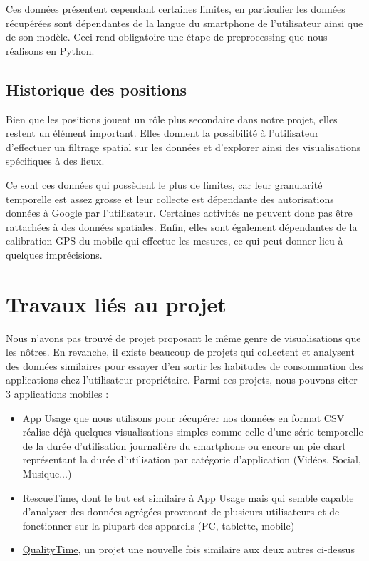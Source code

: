\documentclass[a4paper, 11pt]{article}
\begin{document}
        Ces données présentent cependant certaines limites, en particulier les données récupérées sont dépendantes de la langue du smartphone de l'utilisateur ainsi que de son modèle. Ceci rend obligatoire une étape de preprocessing que nous réalisons en Python.

        \subsection{Historique des positions}
        Bien que les positions jouent un rôle plus secondaire dans notre projet, elles restent un élément important. Elles donnent la possibilité à l'utilisateur d'effectuer un filtrage spatial sur les données et d'explorer ainsi des visualisations spécifiques à des lieux.

        Ce sont ces données qui possèdent le plus de limites, car leur granularité temporelle est assez grosse et leur collecte est dépendante des autorisations données à Google par l'utilisateur. Certaines activités ne peuvent donc pas être rattachées à des données spatiales. Enfin, elles sont également dépendantes de la calibration GPS du mobile qui effectue les mesures, ce qui peut donner lieu à quelques imprécisions.

    \section{Travaux liés au projet}
    Nous n'avons pas trouvé de projet proposant le même genre de visualisations que les nôtres. En revanche, il existe beaucoup de projets qui collectent et analysent des données similaires pour essayer d'en sortir les habitudes de consommation des applications chez l'utilisateur propriétaire. Parmi ces projets, nous pouvons citer 3 applications mobiles :
    \begin{itemize}
        \item \href{https://play.google.com/store/apps/details?id=com.a0soft.gphone.uninstaller&hl=fr}{App Usage} que nous utilisons pour récupérer nos données en format CSV réalise déjà quelques visualisations simples comme celle d'une série temporelle de la durée d'utilisation journalière du smartphone ou encore un pie chart représentant la durée d'utilisation par catégorie d'application (Vidéos, Social, Musique...)
        \item \href{https://www.rescuetime.com/}{RescueTime}, dont le but est similaire à App Usage mais qui semble capable d'analyser des données agrégées provenant de plusieurs utilisateurs et de fonctionner sur la plupart des appareils (PC, tablette, mobile)
        \item \href{https://play.google.com/store/apps/details?id=com.zerodesktop.appdetox.qualitytime&hl=fr}{QualityTime}, un projet une nouvelle fois similaire aux deux autres ci-dessus
    \end{itemize}
\end{document}
